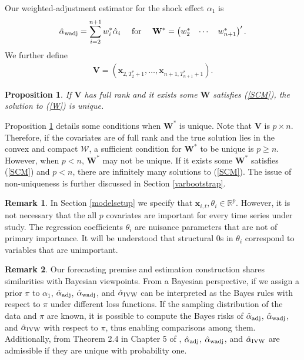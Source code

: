 \documentclass[11pt,3p,review,authoryear]{elsarticle}
\def\mbf#1{\mathbf{#1}} %
\newcommand{\reals}{\mathbb{R}} %
\newtheorem{prop}{Proposition}
\theoremstyle{definition}
\newtheorem{remark}{Remark}
\begin{document}
Our weighted-adjustment estimator for the shock effect $\alpha_1$ is
  \begin{align*}
    \hat{\alpha}_{\rm wadj} = \sum_{i=2}^{n+1} w_i^*\hat{\alpha}_i
    \quad \text{ for } \quad \mbf{W}^* = \begin{pmatrix}
      w^*_2 & \cdots & w^*_{n+1}
    \end{pmatrix}'.
  \end{align*}
 We further define
\begin{align*}
  \mathbf{V} = (\mathbf{x}_{2, T_2^*+1}, \ldots,\mathbf{x}_{n+1, T_{n+1}^*+1}).
\end{align*}
\begin{prop}
  \label{uniqueness} If $\mathbf{V}$ has full rank and it exists some $\mathbf{W}$ satisfies (\ref{SCM}), the solution to  (\ref{W}) is unique.
\end{prop} 
Proposition \ref{uniqueness} details some conditions when $\mathbf{W}^*$ is unique.  Note that $\mathbf{V}$ is $p \times n$. Therefore, if the covariates are of full rank and the true solution lies in the convex and compact $\mathcal{W}$, a sufficient condition for $\mathbf{W}^*$ to be unique is $p \geq n$. However, when $p < n$, $\mathbf{W}^*$ may not be unique. If it exists some $\mathbf{W}^*$ satisfies (\ref{SCM}) and $p < n$, there are infinitely many solutions to (\ref{SCM}).  The issue of non-uniqueness is further discussed in Section \ref{varbootstrap}.

\begin{remark}
\label{remark1}In Section \ref{modelsetup} we specify that $\mbf{x}_{i,t}, \theta_i \in \reals^p$. 
However, it is not necessary that the all $p$ covariates are important for every time series under study. The regression coefficients $\theta_i$ are nuisance parameters that are not of primary importance. 
It will be understood that structural 0s in $\theta_i$ correspond to variables that are unimportant. 
\end{remark}

\begin{remark}
  Our forecasting premise and estimation construction shares similarities with Bayesian viewpoints. From a Bayesian perspective, if we assign a prior $\pi$ to $\alpha_1$, $\hat{\alpha}_{\rm adj}$, $\hat{\alpha}_{\rm wadj}$, and $\hat{\alpha}_{\rm IVW}$ can be interpreted as the Bayes rules with respect to $\pi$ under different loss functions. If the sampling distribution of the data and $\pi$ are known, it is possible to compute the Bayes risks of $\hat{\alpha}_{\rm adj}$, $\hat{\alpha}_{\rm wadj}$, and $\hat{\alpha}_{\rm IVW}$ with respect to $\pi$,  thus enabling comparisons among them. Additionally, from Theorem 2.4 in Chapter 5 of \cite{lehmann2006theory}, $\hat{\alpha}_{\rm adj}$, $\hat{\alpha}_{\rm wadj}$, and $\hat{\alpha}_{\rm IVW}$ are admissible if they are unique with probability one.
\end{remark}
\end{document}
